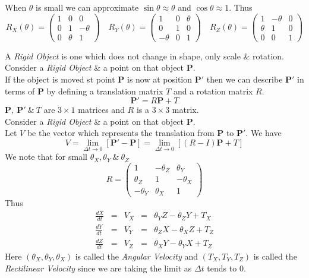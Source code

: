 \documentclass[11pt,a4paper]{article}
\begin{document}
When $\theta$ is small we can approximate $\sin\theta\approx\theta$ and $\cos\theta\approx1$. Thus
$$R_X(\theta)=\begin{pmatrix}1&0&0\\0&1&-\theta\\0&\theta&1\end{pmatrix}\quad R_Y(\theta)=\begin{pmatrix}1&0&\theta\\0&1&0\\-\theta&0&1\end{pmatrix}\quad R_Z(\theta)=\begin{pmatrix}1&-\theta&0\\\theta&1&0\\0&0&1\end{pmatrix}$$

A \textit{Rigid Object} is one which does not change in shape, only scale \& rotation.\\

Consider a \textit{Rigid Object} \& a point on that object $\textbf{P}$.\\
If the object is moved st point $\textbf{P}$ is now at position $\textbf{P}'$ then we can describe $\textbf{P}'$ in terms of $\textbf{P}$ by defining a translation matrix $T$ and a rotation matrix $R$.
$$\textbf{P}'=R\textbf{P}+T$$
\nb $\textbf{P},\ \textbf{P}'\ \&\ T$ are $3\times1$ matrices and $R$ is a $3\times3$ matrix.\\

Consider a \textit{Rigid Object} \& a point on that object $\textbf{P}$.\\
Let $V$ be the vector which represents the translation from $\textbf{P}$ to $\textbf{P}'$. We have
$$V=\lim_{\Delta t\to0}[\textbf{P}'-\textbf{P}]=\lim_{\Delta t\to0}[(R-I)\textbf{P}+T]$$
We note that for small $\theta_X,\theta_Y\ \&\ \theta_Z$
$$R=\begin{pmatrix}1&-\theta_Z&\theta_Y\\\theta_Z&1&-\theta_X\\-\theta_Y&\theta_X&1\end{pmatrix}$$
Thus
\[\begin{array}{rcccl}
\frac{dX}{dt}&=&V_X&=&\theta_YZ-\theta_ZY+T_X\\
\frac{dY}{dt}&=&V_Y&=&\theta_ZX-\theta_XZ+T_Z\\
\frac{dZ}{dt}&=&V_Z&=&\theta_XY-\theta_YX+T_Z
\end{array}\]
\nb Here $(\theta_X,\theta_Y,\theta_X)$ is called the \textit{Angular Velocity} and $(T_X,T_Y,T_Z)$ is called the \textit{Rectilinear Velocity} since we are taking the limit as $\Delta t$ tends to 0.\\
\end{document}
